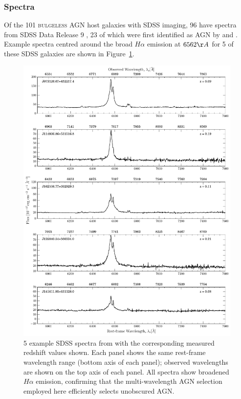 \subsubsection{Spectra}\label{sec:spectra}

Of the 101 \textsc{bulgeless} AGN host galaxies with SDSS imaging, 96 have spectra from SDSS Data Release 9 \citep{ahn12}, 23 of which were first identified as AGN by \cite{shen08} and \cite{edelson12}. Example spectra centred around the broad $H\alpha$ emission at $6562\AA$ for 5 of these SDSS galaxies are shown in Figure~\ref{fig:SDSSspectra}.

\begin{figure}
\centering
\includegraphics[height=0.8\textheight]{agn/sample_sdss_spectra.pdf}
\caption[Optical SDSS spectra of 5 galaxies in the \textsc{bulgeless} sample]{5 example SDSS spectra from with the corresponding measured redshift values shown. Each panel shows the same rest-frame wavelength range (bottom axis of each panel); observed wavelengths are shown on the top axis of each panel. All spectra show broadened  $H\alpha$ emission, confirming that the multi-wavelength AGN selection employed here efficiently selects unobscured AGN.}
\label{fig:SDSSspectra}
\end{figure}

